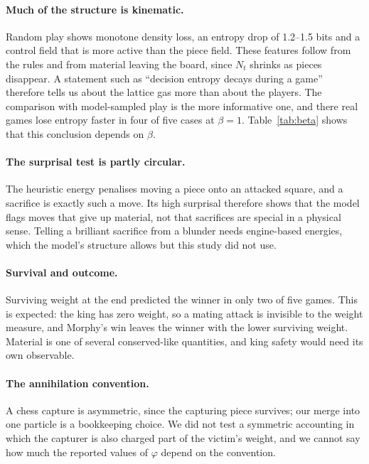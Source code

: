 \documentclass[11pt,a4paper]{article}
\begin{document}
\paragraph{Much of the structure is kinematic.} Random play shows monotone density loss, an entropy drop of 1.2--1.5 bits and a control field that is more active than the piece field. These features follow from the rules and from material leaving the board, since $N_t$ shrinks as pieces disappear. A statement such as ``decision entropy decays during a game'' therefore tells us about the lattice gas more than about the players. The comparison with model-sampled play is the more informative one, and there real games lose entropy faster in four of five cases at $\beta=1$. Table~\ref{tab:beta} shows that this conclusion depends on $\beta$.

\paragraph{The surprisal test is partly circular.} The heuristic energy penalises moving a piece onto an attacked square, and a sacrifice is exactly such a move. Its high surprisal therefore shows that the model flags moves that give up material, not that sacrifices are special in a physical sense. Telling a brilliant sacrifice from a blunder needs engine-based energies, which the model's structure allows but this study did not use.

\paragraph{Survival and outcome.} Surviving weight at the end predicted the winner in only two of five games. This is expected: the king has zero weight, so a mating attack is invisible to the weight measure, and Morphy's win leaves the winner with the lower surviving weight. Material is one of several conserved-like quantities, and king safety would need its own observable.

\paragraph{The annihilation convention.} A chess capture is asymmetric, since the capturing piece survives; our merge into one particle is a bookkeeping choice. We did not test a symmetric accounting in which the capturer is also charged part of the victim's weight, and we cannot say how much the reported values of $\varphi$ depend on the convention.
\end{document}
